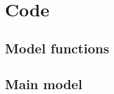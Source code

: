 
\appendixtoc
{}
\label{app:appendix}


%  
%
%


\chapter{Code}
\label{app:code}

\section{Model functions}

% 


% 

\section{Main model}

